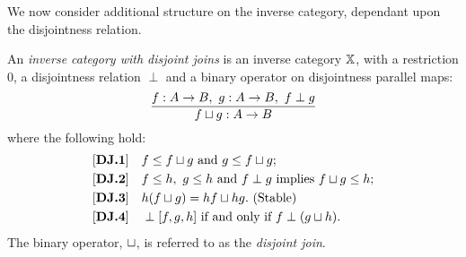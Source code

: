We now consider additional structure on the inverse category, dependant upon the disjointness
relation.
\begin{definition}\label{def:disjoint_join}
  An \emph{inverse category with disjoint joins} is an inverse category $\mathbb{X}$, with a restriction
  $0$, a disjointness relation $\perp$ and a binary operator on disjointness parallel maps:
  \[
    \infer{f \djoin g : A \to B}{f: A\to B,\ g: A\to B,\ f \perp g}
  \]
  where the following hold:
  \begin{align*}
    \axiom{DJ}{1}\quad & f \le f \djoin g\text{ and }g \le f \djoin g; \\
    \axiom{DJ}{2}\quad & f \le h,\ g \le h\text{ and }f\perp g\text{ implies }f \djoin g \le h;\\
    \axiom{DJ}{3}\quad & h(f \djoin g) = h f \djoin h g. \text{ (Stable)} \\
    \axiom{DJ}{4}\quad & \cdperp [f, g, h]\text{ if and only if }f \perp (g\djoin h).\\
  \end{align*}
  The binary operator, $\sqcup$, is referred to as the \emph{disjoint join}.
\end{definition}

